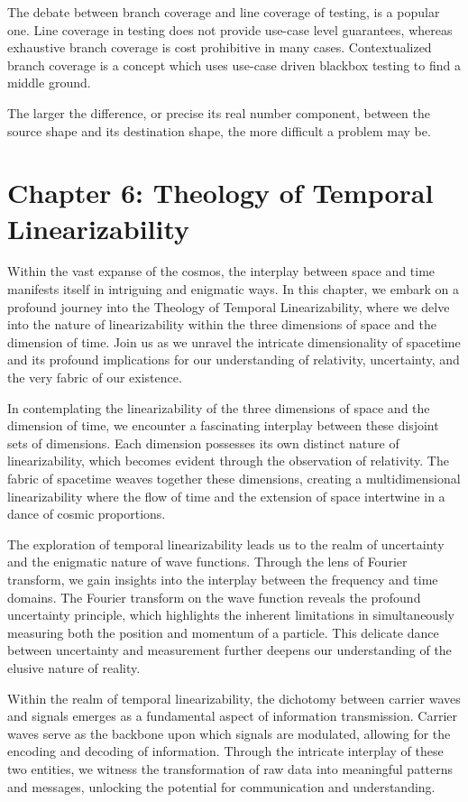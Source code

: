 \documentclass[ebook,12pt,oneside,openany]{memoir}
\begin{document}
\indent The debate between branch coverage and line coverage of testing, is a popular one. Line coverage in testing does not provide use-case level guarantees, whereas exhaustive branch coverage is cost prohibitive in many cases. Contextualized branch coverage is a concept which uses use-case driven blackbox testing to find a middle ground.

\indent The larger the difference, or precise its real number component, between the source shape and its destination shape, the more difficult a problem may be.
\chapter*{Chapter 6: Theology of Temporal Linearizability}


\indent \indent Within the vast expanse of the cosmos, the interplay between space and time manifests itself in intriguing and enigmatic ways. In this chapter, we embark on a profound journey into the Theology of Temporal Linearizability, where we delve into the nature of linearizability within the three dimensions of space and the dimension of time. Join us as we unravel the intricate dimensionality of spacetime and its profound implications for our understanding of relativity, uncertainty, and the very fabric of our existence.

\indent In contemplating the linearizability of the three dimensions of space and the dimension of time, we encounter a fascinating interplay between these disjoint sets of dimensions. Each dimension possesses its own distinct nature of linearizability, which becomes evident through the observation of relativity. The fabric of spacetime weaves together these dimensions, creating a multidimensional linearizability where the flow of time and the extension of space intertwine in a dance of cosmic proportions.

\indent The exploration of temporal linearizability leads us to the realm of uncertainty and the enigmatic nature of wave functions. Through the lens of Fourier transform, we gain insights into the interplay between the frequency and time domains. The Fourier transform on the wave function reveals the profound uncertainty principle, which highlights the inherent limitations in simultaneously measuring both the position and momentum of a particle. This delicate dance between uncertainty and measurement further deepens our understanding of the elusive nature of reality.

\indent Within the realm of temporal linearizability, the dichotomy between carrier waves and signals emerges as a fundamental aspect of information transmission. Carrier waves serve as the backbone upon which signals are modulated, allowing for the encoding and decoding of information. Through the intricate interplay of these two entities, we witness the transformation of raw data into meaningful patterns and messages, unlocking the potential for communication and understanding.
\end{document}
